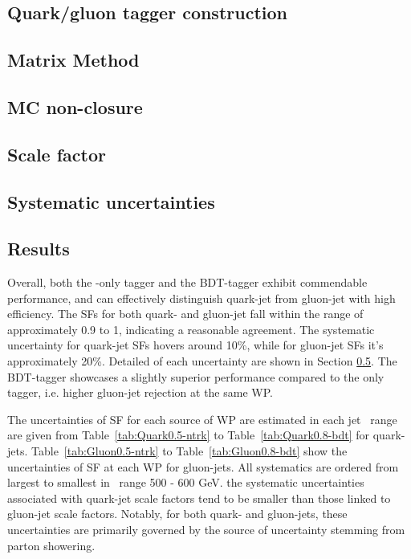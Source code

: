 \subsection{Quark/gluon tagger construction}
\label{sec:QG-var}


\subsection{Matrix Method}
\label{sec:QG-method}


\subsection{MC non-closure}
\label{sec:QG-closure}


\subsection{Scale factor}
\label{sec:QG-SF}


\subsection{Systematic uncertainties}
\label{sec:QG-syst}


\subsection{Results}

Overall, both the \ntrk-only tagger and the BDT-tagger exhibit commendable performance, and can effectively distinguish quark-jet from gluon-jet with high efficiency. The SFs for both quark- and gluon-jet  fall within the range of approximately 0.9 to 1, indicating a reasonable agreement. The systematic uncertainty for quark-jet SFs hovers around 10\%, while for gluon-jet SFs it's approximately 20\%.  Detailed of each uncertainty are shown in Section \ref{sec:QG-syst}. The BDT-tagger showcases a slightly superior performance compared to the {\ntrk} only tagger, i.e. higher gluon-jet rejection at the same WP.

The uncertainties of SF for each source of WP are estimated in each jet \pt~range are given from Table~\ref{tab:Quark0.5-ntrk} to Table~\ref{tab:Quark0.8-bdt} for quark-jets. Table~\ref{tab:Gluon0.5-ntrk} to Table~\ref{tab:Gluon0.8-bdt} show the uncertainties of SF at each WP for gluon-jets. All systematics are ordered from largest to smallest in \pt~range 500 - 600 GeV. the systematic uncertainties associated with quark-jet scale factors tend to be smaller than those linked to gluon-jet scale factors. Notably, for both quark- and gluon-jets, these uncertainties are primarily governed by the source of uncertainty stemming from parton showering.


